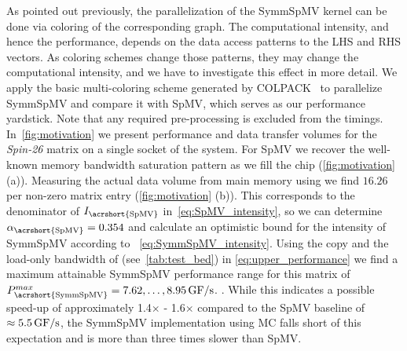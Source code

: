 
As pointed out previously, the parallelization of
the \acrshort{SymmSpMV} kernel can be done
via \DTWO coloring of the corresponding graph. The computational
intensity, and hence the performance, depends on the data access
patterns to the LHS and RHS vectors. As coloring schemes change those
patterns, they may change the computational intensity, and we have to
investigate this effect in more detail. We apply the basic
multi-coloring scheme generated by COLPACK~\cite{COLPACK} to
parallelize \acrshort{SymmSpMV} and compare it with \acrshort{SpMV},
which serves as our performance yardstick. Note that any required
pre-processing is excluded from the timings. In~\cref{fig:motivation}
we present performance and data transfer volumes for
the \emph{Spin-26} matrix on a single socket of the \IVB
system. For \acrshort{SpMV} we recover the well-known memory bandwidth
saturation pattern as we fill the chip (\cref{fig:motivation}
(a)). Measuring the actual data volume from main memory using \LIKWID
we find $16.26$ \BYTE {} per non-zero matrix entry (\cref{fig:motivation}
(b)). This corresponds to the denominator of
$I_\mathrm{\acrshort{SpMV}}$ in~\cref{eq:SpMV_intensity}, so we can
determine $\alpha_\mathrm{\acrshort{SpMV}}=0.354$ and calculate an 
optimistic bound for the intensity of \acrshort{SymmSpMV} according to ~\cref{eq:SymmSpMV_intensity}.
Using the copy and the load-only
bandwidth of \IVB (see~\cref{tab:test_bed}) in \cref{eq:upper_performance} we find a maximum
attainable {\acrshort{SymmSpMV}} performance range for this matrix of
$P^{max}_\mathrm{\acrshort{SymmSpMV}}=7.62,\ldots,8.95\,\GF$. . While this indicates a possible
speed-up of approximately 1.4$\times$ - 1.6$\times$ compared to the \acrshort{SpMV}
baseline of $\approx 5.5\,\mbox{GF/s}$, the \acrshort{SymmSpMV} implementation
using \acrfull{MC} falls short of this expectation and is more than
three times slower than \acrshort{SpMV}.
